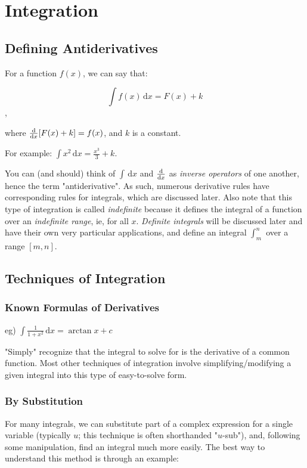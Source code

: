 \documentclass[12pt]{article}
\begin{document}
\section{Integration}
\subsection{Defining Antiderivatives}

For a function $f(x)$, we can say that:

$$\int f(x) \,\text{d}x = F(x) + k$$,

where $\frac{\text{d}}{\text{d}x} [F(x)+k] = f(x)$, and $k$ is a constant.

For example: $\int x^2 \,\text{d}x = \frac{x^3}{3} + k$.

You can (and should) think of $\int \, \text{d}x$ and $\frac{\text{d}}{\text{d}x}$ as \textit{inverse operators} of one another, hence the term "antiderivative". As such, numerous derivative rules have corresponding rules for integrals, which are discussed later. Also note that this type of integration is called \textit{indefinite} because it defines the integral of a function over an \textit{indefinite range}, ie, for all $x$. \textit{Definite integrals} will be discussed later and have their own very particular applications, and define an integral $\int_m^n$ over a range $[m,n]$.

\subsection{Techniques of Integration}
\subsubsection{Known Formulas of Derivatives}

eg) $\int \frac{1}{1+x^2} \,\text{d}x = \arctan x + c$

"Simply" recognize that the integral to solve for is the derivative of a common function. Most other techniques of integration involve simplifying/modifying a given integral into this type of easy-to-solve form.

\subsubsection{By Substitution}

For many integrals, we can substitute part of a complex expression for a single variable (typically $u$; this technique is often shorthanded "$u$-sub"), and, following some manipulation, find an integral much more easily. The best way to understand this method is through an example:
\end{document}

